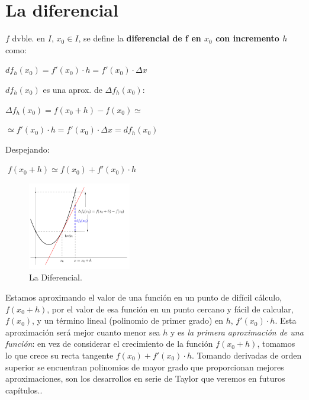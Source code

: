 	\section{La diferencial}
				\begin{multicols}{2}
					
				

				
				$f$ dvble. en $I$, $x_0 \in I$, se define la  \textbf{diferencial de f en $x_0$ con incremento $h$} como:
				
	
				$df_h (x_0)=f'(x_0)\cdot h=f'(x_0)\cdot \Delta x$
				
			
				$df_h (x_0)$ es una aprox. de $\Delta f_h (x_0)$:
				
				$\Delta f_h(x_0)= f(x_0+h)-f(x_0) \simeq$
				
				$\simeq f'(x_0)\cdot h = f'(x_0)\cdot \Delta x = df_h(x_0)$
				
			
				Despejando: 
				
				$\boxed {\; f(x_0+h)\simeq f(x_0)+f'(x_0)\cdot h \; }$ 
				
			
		\begin{figure}[H]
			\centering
			\includegraphics[width=0.40\textwidth]{imagenes/imagenes04/T04IM13.png}
			\caption {La Diferencial.}
		\end{figure}
			
		\end{multicols}	
		
		
		Estamos aproximando el valor de una función en un punto de difícil cálculo, $f(x_0+h)$, por el valor de esa función en un punto cercano y fácil de calcular, $f(x_0)$, y un término lineal (polinomio de primer grado) en $h$, $f'(x_0)\cdot h$. Esta aproximación será mejor cuanto menor sea $h$ y es \textit{la primera aproximación de una función}: en vez de considerar el crecimiento de la función $f(x_0+h)$, tomamos lo que crece su recta tangente $f(x_0)+f'(x_0)\cdot h$. Tomando derivadas de orden superior se encuentran polinomios de mayor grado que proporcionan mejores aproximaciones, son los desarrollos en serie de Taylor que veremos en futuros capítulos..
		
